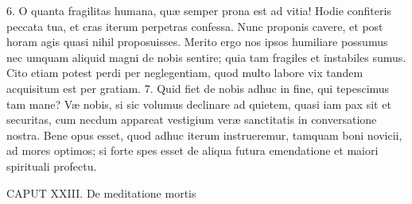 6. O quanta fragilitas humana, quæ semper prona est ad vitia! Hodie confiteris peccata tua, et cras iterum perpetras confessa. Nunc proponis cavere, et post horam agis quasi nihil proposuisses. Merito ergo nos ipsos humiliare possumus nec umquam aliquid magni de nobis sentire; quia tam fragiles et instabiles sumus. Cito etiam potest perdi per neglegentiam, quod multo labore vix tandem acquisitum est per gratiam.
7. Quid fiet de nobis adhuc in fine, qui tepescimus tam mane? Væ nobis, si sic volumus declinare ad quietem, quasi iam pax sit et securitas, cum necdum appareat vestigium veræ sanctitatis in conversatione nostra. Bene opus esset, quod adhuc iterum instrueremur, tamquam boni novicii, ad mores optimos; si forte spes esset de aliqua futura emendatione et maiori spirituali profectu.


CAPUT XXIII.
De meditatione mortis

